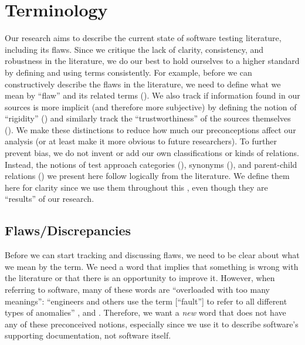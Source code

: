 \section{Terminology}
\label{terminology}

Our research aims to describe the current state of software testing literature,
including its flaws. Since we critique the lack of clarity, consistency, and
robustness in the literature, we do our best to hold ourselves to a higher
standard by defining and using terms consistently. For example, before we can
constructively describe the flaws in the literature, we need to define what
we mean by ``flaw'' and its related terms (). We also track if
information found in our sources is more implicit (and therefore more
subjective) by defining the notion of ``rigidity'' () and
similarly track the ``trustworthiness'' of the sources themselves
(). We make these distinctions to reduce how much our
preconceptions affect our analysis (or at least make it more obvious to future
researchers). To further prevent bias, we do not invent
or add our own classifications or kinds of relations. Instead, the notions of
test approach categories (), synonyms (), and
parent-child relations () we present here
follow logically from the literature. We define them here for clarity
since we use them throughout this \docType{}, even though they are
``results'' of our research.

\subsection{Flaws/Discrepancies}\label{flaw-def}

Before we can start tracking and discussing flaws, we need to be clear about
what we mean by the term.
We need a word that implies that something is wrong with the literature
or that there is an opportunity to improve it. However, when referring to
software, many of these words are ``overloaded with too many meanings'':
``engineers and others use the term [``fault''] to refer to all different types
of anomalies'' \citep[p.~12\=/3]{SWEBOK2024}, and \genDefectFlaw{}. Therefore,
we want a \emph{new} word that does not have any of these preconceived notions,
especially since we use it to describe software's supporting documentation, not
software itself.


